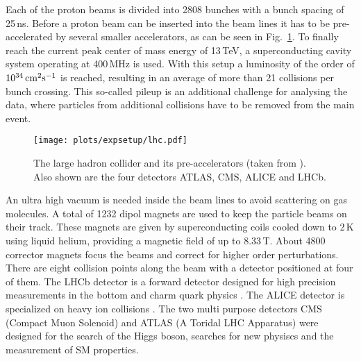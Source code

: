 \noindent Each of the proton beams is divided into 2808 bunches with a bunch spacing of 25\,ns. Before a proton beam can be inserted into the beam lines it has to be pre-accelerated by several smaller accelerators, as can be seen in Fig.~\ref{fig:expsetup:lhc}. To finally reach the current peak center of mass energy of 13\,TeV, a superconducting cavity system operating at 400\,MHz is used. With this setup a luminosity of the order of $10^{34}\,\rm{cm}^2\rm{s}^{-1}$ is reached, resulting in an average of more than 21 collisions per bunch crossing. This so-called pileup is an additional challenge for analysing the data, where particles from additional collisions have to be removed from the main event.\\
\begin{figure}[t]
	\centering
	\texttt{[image: plots/expsetup/lhc.pdf]}
	\caption[The large hadron collider]{The large hadron collider and its pre-accelerators (taken from \cite{lhc_fig}). Also shown are the four detectors ATLAS, CMS, ALICE and LHCb.}
	\label{fig:expsetup:lhc}
\end{figure}

\noindent An ultra high vacuum is needed inside the beam lines to avoid scattering on gas molecules. A total of 1232 dipol magnets are used to keep the particle beams on their track. These magnets are given by superconducting coils cooled down to 2\,K using liquid helium, providing a magnetic field of up to 8.33\,T. About 4800 corrector magnets focus the beams and correct for higher order perturbations.\\




\noindent There are eight collision points along the beam with a detector positioned at four of them. The LHCb detector is a forward detector designed for high precision measurements in the bottom and charm quark physics \cite{LHCB}. The ALICE detector is specialized on heavy ion collisions \cite{ALICE}. The two multi purpose detectors CMS (Compact Muon Solenoid) and ATLAS (A Toridal LHC Apparatus) were designed for the search of the Higgs boson, searches for new physiscs and the measurement of SM properties.

